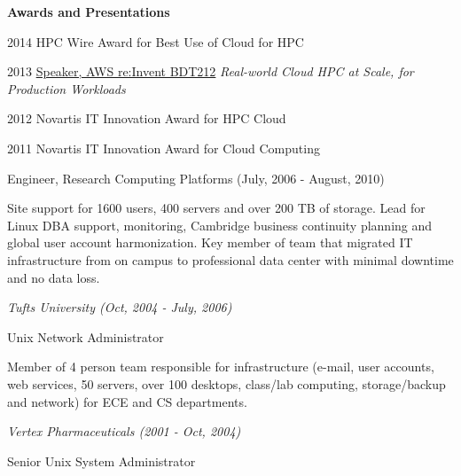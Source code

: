 \documentclass[11pt,article,oneside]{memoir}
\begin{document}
\medskip
\ind \hspace{0.35in} \footnotesize \textbf{Awards and Presentations}

\ind \hspace{0.35in} \footnotesize 2014 HPC Wire Award for Best Use of Cloud for HPC

\ind \hspace{0.35in} \footnotesize 2013 \href{https://www.youtube.com/watch?v=--ALfYpw_aM}{Speaker, AWS re:Invent BDT212} \emph{Real-world Cloud HPC at Scale, for Production Workloads}

\ind \hspace{0.35in} \footnotesize 2012 Novartis IT Innovation Award for HPC Cloud

\ind \hspace{0.35in} \footnotesize 2011 Novartis IT Innovation Award for Cloud Computing

\medskip

\ind \footnotesize Engineer, Research Computing Platforms (July, 2006 - August, 2010)

\ind \hspace{0.35in} \footnotesize Site support for 1600 users, 400 servers and over 200 TB of storage. Lead for Linux DBA support, monitoring, Cambridge business continuity planning and global user account harmonization. Key member of team that migrated IT infrastructure from on campus to professional data center with minimal downtime and no data loss.

\vspace{-0.075in}

\normalsize

\bigskip
\noindent\emph{Tufts University (Oct, 2004 - July, 2006) \vspace{0.05in}}

\ind \footnotesize Unix Network Administrator

\ind \hspace{0.35in} \footnotesize Member of 4 person team responsible for infrastructure (e-mail, user accounts, web services, 50 servers, over 100 desktops, class/lab computing, storage/backup and network) for ECE and CS departments.

\vspace{-0.075in}

\normalsize

\bigskip
\noindent\emph{Vertex Pharmaceuticals (2001 - Oct, 2004) \vspace{0.05in}}

\ind \footnotesize Senior Unix System Administrator
\end{document}
